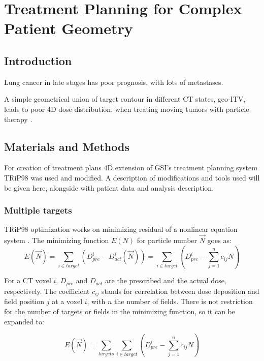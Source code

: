 \documentclass[type=dr, dr=rernat, accentcolor=tud7b,colorbacktitle, bigchapter, openright, twoside, 12pt ]{tudthesis}
\begin{document}
\chapter{Treatment Planning for Complex Patient Geometry}
\label{chapter:vmm}
\minitoc

\section{Introduction}

Lung cancer in late stages has poor prognosis, with lots of metastases.

A simple geometrical union of target contour in different CT states, geo-ITV, leads to poor 4D dose distribution, when treating moving tumors with particle therapy \cite{Rietzel2010}.

\section{Materials and Methods}

For creation of treatment plans 4D extension of GSI's treatment planning system TRiP98 \cite{Kraemer2000a, Richter2013} was used and modified. A description of modifications and tools used will be given here, 
alongside with patient data and analysis description.

\subsection{Multiple targets}

TRiP98 optimization works on minimizing residual of a nonlinear equation system \cite{Kraemer2000a}. The minimizing function $E(N)$ for particle number $\vec{N}$ goes as:
\begin{equation}
\label{eq-costFunc}
 E(\vec{N}) = \sum_{i\in target} \left( D_{pre}^{i} - D_{act}^{i}(\vec{N})\right) = \sum_{i\in target} \left( D_{pre}^{i} -\sum_{j=1}^n c_{ij}N\right)
\end{equation}

For a CT voxel $i$, $ D_{pre}$ and $D_{act}$ are the prescribed and the actual dose, respectively. The coefficient $c_{ij}$ stands for correlation between dose deposition and field position $j$ at a voxel $i$, with $n$ the number of fields. There is not restriction for the number of targets or fields in the minimizing function, so it can be expanded to:

\begin{equation}
\label{eq-multiCost}
 E(\vec{N}) = \sum_{targets} \sum_{i\in target} \left( D_{pre}^{i} -\sum_{j=1}^n c_{ij}N\right)
\end{equation}
\end{document}
